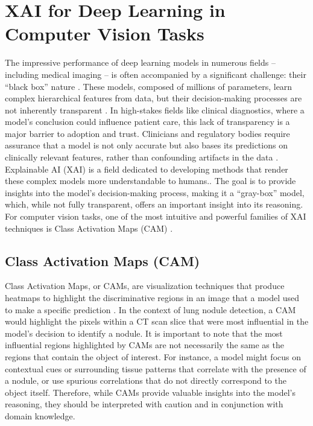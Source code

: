 \section{XAI for Deep Learning in Computer Vision Tasks}
The impressive performance of deep learning models in numerous fields -- including medical imaging -- is often accompanied by a significant challenge: their ``black box'' nature \cite{chaddad2023survey, singh2025beyond}. These models, composed of millions of parameters, learn complex hierarchical features from data, but their decision-making processes are not inherently transparent \cite{moradi2024model}. In high-stakes fields like clinical diagnostics, where a model's conclusion could influence patient care, this lack of transparency is a major barrier to adoption and trust. Clinicians and regulatory bodies require assurance that a model is not only accurate but also bases its predictions on clinically relevant features, rather than confounding artifacts in the data \cite{kingma2017adam}.
Explainable AI (XAI) is a field dedicated to developing methods that render these complex models more understandable to humans.\cite{kinger2024review}. The goal is to provide insights into the model's decision-making process, making it a ``gray-box'' model, which, while not fully transparent, offers an important insight into its reasoning. For computer vision tasks, one of the most intuitive and powerful families of XAI techniques is Class Activation Maps (CAM) \cite{minh2023overview}.


\subsection{Class Activation Maps (CAM)}
Class Activation Maps, or CAMs, are visualization techniques that produce heat\-maps to highlight the discriminative regions in an image that a model used to make a specific prediction \cite{minh2023overview}. In the context of lung nodule detection, a CAM would highlight the pixels within a CT scan slice that were most influential in the model's decision to identify a nodule.
It is important to note that the most influential regions highlighted by CAMs are not necessarily the same as the regions that contain the object of interest. For instance, a model might focus on contextual cues or surrounding tissue patterns that correlate with the presence of a nodule, or use spurious correlations that do not directly correspond to the object itself. Therefore, while CAMs provide valuable insights into the model's reasoning, they should be interpreted with caution and in conjunction with domain knowledge.


